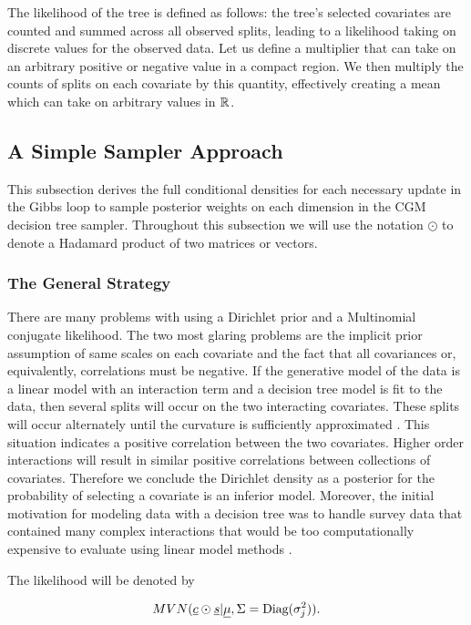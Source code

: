  The likelihood of the tree is defined as follows: the tree's selected covariates are counted and summed across all observed splits, leading to a likelihood taking on discrete values for the observed data. Let us define a multiplier that can take on an arbitrary positive or negative value in a compact region. We then multiply the counts of splits on each covariate by this quantity, effectively creating a mean which can take on arbitrary values in $\mathbb{R}^{}$. 

\subsection{A Simple Sampler Approach}

This subsection derives the full conditional densities for each necessary update in the Gibbs loop to sample posterior weights on each dimension in the CGM decision tree sampler. 
 Throughout this subsection we will use the notation $\odot$ to denote a Hadamard product of two matrices or vectors. 
 
 \subsubsection{The General Strategy}
 There are many problems with using a Dirichlet prior and a Multinomial conjugate likelihood. The two most glaring problems are the implicit prior assumption of same scales on each covariate and the fact that all covariances or, equivalently, correlations must be negative. If the generative model of the data is a linear model with an interaction term and a decision tree model is fit to the data, then several splits will occur on the two interacting covariates. These splits will occur alternately until the curvature is sufficiently approximated \cite{ishwaran2010high}. This situation indicates a positive correlation between the two covariates. Higher order interactions will result in similar positive correlations between collections of covariates. Therefore we conclude the Dirichlet density as a posterior for the probability of selecting a covariate is an inferior model. Moreover, the initial motivation for modeling data with a decision tree was to handle survey data that contained many complex interactions that would be too computationally expensive to evaluate using linear model methods \cite{morgan1963problems}. 
 
 The likelihood will be denoted by
 
 \begin{equation}\newnot{symbol:mvn}
 MVN(\vec{c}\odot\vec{s}\vert \vec{\mu}, \Sigma=\text{Diag}(\sigma^2_j)).
 \end{equation}
 
